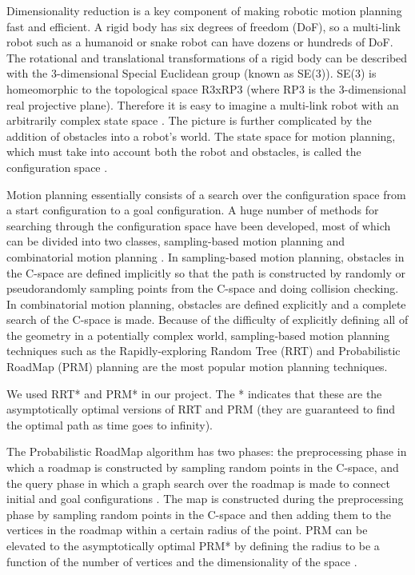 \documentclass[12pt]{article}
\begin{document}
\maketitle

Dimensionality reduction is a key component of making robotic motion planning
fast and efficient. A rigid body has six degrees of freedom (DoF), so a
multi-link robot such as a humanoid or snake robot can have dozens or hundreds
of DoF. The rotational and translational transformations of a rigid body can be
described with the 3-dimensional Special Euclidean group (known as SE(3)).
SE(3) is homeomorphic to the topological space R3xRP3 (where RP3 is the
3-dimensional real projective plane). Therefore it is easy to imagine a
multi-link robot with an arbitrarily complex state space \cite{transeth2008snakerobot}. The picture is
further complicated by the addition of obstacles into a robot's world. The
state space for motion planning, which must take into account both the robot
and obstacles, is called the configuration space \cite{lozano1983spatial}. 

Motion planning essentially consists of a search over the configuration space
from a start configuration to a goal configuration. A huge number of methods
for searching through the configuration space have been developed, most of
which can be divided into two classes, sampling-based motion planning and
combinatorial motion planning \cite{lavalle2006planning}. In sampling-based motion planning, obstacles in
the C-space are defined implicitly so that the path is constructed by randomly
or pseudorandomly sampling points from the C-space and doing collision
checking. In combinatorial motion planning, obstacles are defined explicitly
and a complete search of the C-space is made. Because of the difficulty of
explicitly defining all of the geometry in a potentially complex world,
sampling-based motion planning techniques such as the Rapidly-exploring Random
Tree (RRT) and Probabilistic RoadMap (PRM) planning are the most popular motion
planning techniques.

We used RRT* and PRM* in our project. The * indicates that these are the
asymptotically optimal versions of RRT and PRM (they are guaranteed to find the
optimal path as time goes to infinity).

The Probabilistic RoadMap algorithm has two phases: the preprocessing phase in which a roadmap is constructed by sampling random points in the C-space, and the query phase in which a graph search over the roadmap is made to connect initial and goal configurations \cite{kavraki1996prm}. The map is constructed during the preprocessing phase by sampling random points in the C-space and then adding them to the vertices in the roadmap within a certain radius of the point. PRM can be elevated to the asymptotically optimal PRM* by defining the radius to be a function of the number of vertices and the dimensionality of the space \cite{karaman2011sampling}.
\end{document}

